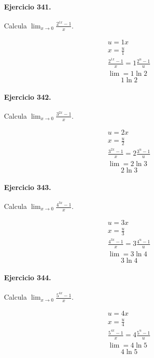 \documentclass[11pt,a4paper]{article}
\begin{document}
\paragraph{Ejercicio 341.} Calcula $\displaystyle\lim_{x\to0}\frac{2^{1x}-1}{x}$.

\[
\begin{aligned}
u=1x\\
x=\frac{u}{1}\\
\frac{2^{1x}-1}{x}=1\frac{2^u-1}{u}\\
\lim=1\ln 2
\end{aligned}
\]
\[\boxed{1\ln 2}\]


\paragraph{Ejercicio 342.} Calcula $\displaystyle\lim_{x\to0}\frac{3^{2x}-1}{x}$.

\[
\begin{aligned}
u=2x\\
x=\frac{u}{2}\\
\frac{3^{2x}-1}{x}=2\frac{3^u-1}{u}\\
\lim=2\ln 3
\end{aligned}
\]
\[\boxed{2\ln 3}\]


\paragraph{Ejercicio 343.} Calcula $\displaystyle\lim_{x\to0}\frac{4^{3x}-1}{x}$.

\[
\begin{aligned}
u=3x\\
x=\frac{u}{3}\\
\frac{4^{3x}-1}{x}=3\frac{4^u-1}{u}\\
\lim=3\ln 4
\end{aligned}
\]
\[\boxed{3\ln 4}\]


\paragraph{Ejercicio 344.} Calcula $\displaystyle\lim_{x\to0}\frac{5^{4x}-1}{x}$.

\[
\begin{aligned}
u=4x\\
x=\frac{u}{4}\\
\frac{5^{4x}-1}{x}=4\frac{5^u-1}{u}\\
\lim=4\ln 5
\end{aligned}
\]
\[\boxed{4\ln 5}\]
\end{document}
